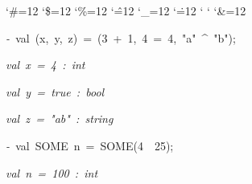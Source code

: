 \begin{list}{}
{\setlength{\leftmargin}{\leftmargini}
\setlength{\rightmargin}{0cm}
\setlength{\itemindent}{0cm}
\setlength{\listparindent}{0cm}
\setlength{\itemsep}{0cm}
\setlength{\parsep}{0cm}
\setlength{\labelsep}{0cm}
\setlength{\labelwidth}{0cm}
\catcode`\#=12
\catcode`\$=12
\catcode`\%=12
\catcode`\^=12
\catcode`\_=12
\catcode`\.=12
\catcode`
\catcode`
\catcode`\&=12
\ttfamily}
\small
\item[]\textsl{-\ }val\ (x,\ y,\ z)\ =\ (3\ +\ 1,\ 4\ =\ 4,\ "a"\ ^\ "b");
\item[]\textsl{val\ x\ =\ 4\ :\ int}
\item[]\textsl{val\ y\ =\ true\ :\ bool}
\item[]\textsl{val\ z\ =\ "ab"\ :\ string}
\item[]\textsl{-\ }val\ SOME\ n\ =\ SOME(4\ \ 25);
\item[]\textsl{val\ n\ =\ 100\ :\ int}
\end{list}
